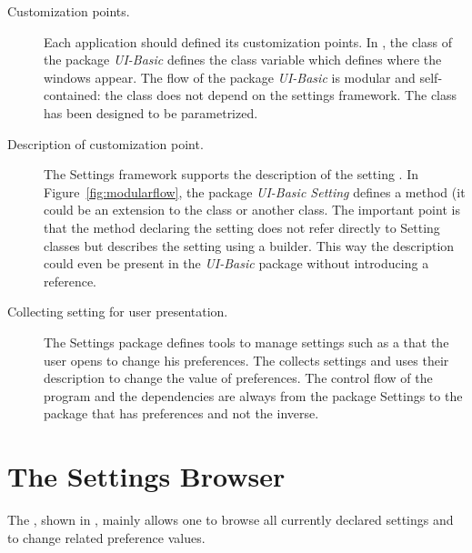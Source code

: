 \documentclass[a4paper,10pt,twoside]{book}
\begin{document}
\begin{description}
\item[Customization points.] Each application should defined its customization points. In , the class  of the package \emph{UI-Basic} defines the class variable  which defines where the windows appear. The flow of the package \emph{UI-Basic} is modular and self-contained: the class  does not depend on the settings framework.  The class   has been designed to be parametrized.

\item[Description of customization point.] The Settings framework supports the description of the setting . In Figure~\ref{fig:modularflow}, the package \emph{UI-Basic Setting} defines a method (it could be an extension to the class  or another class. The important point is that the method declaring the setting does not refer directly to Setting classes but describes the setting using a builder. This way the description could even be present in the \emph{UI-Basic} package without introducing a reference.

\item[Collecting setting for user presentation.] The Settings package defines tools to manage settings such as a \setbrowser that the user opens to change his preferences. The \setbrowser collects settings and uses their description to change the value of preferences.
The control flow of the program and the dependencies are always from the package Settings to the package that has preferences and not the inverse. 
\end{description}

\section{The Settings Browser}
\label{sec:TheSettingsBrowser}
The \setbrowser, shown in , mainly allows one to browse all currently declared settings and to change related preference values. 
\end{document}

